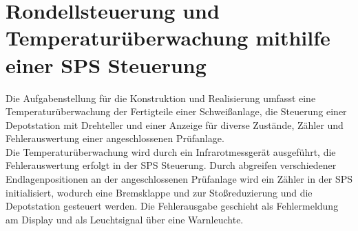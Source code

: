 \documentclass[12pt,a4paper]{scrartcl}	%
\begin{document}
\section{Rondellsteuerung und Temperaturüberwachung mithilfe einer SPS Steuerung}
Die Aufgabenstellung für die Konstruktion und Realisierung umfasst eine Temperaturüberwachung der Fertigteile einer Schweißanlage, die Steuerung einer Depotstation mit Drehteller und einer Anzeige für diverse Zustände, Zähler und Fehlerauswertung einer angeschlossenen Prüfanlage.\\
Die Temperaturüberwachung wird durch ein Infrarotmessgerät ausgeführt, die Fehlerauswertung erfolgt in der SPS Steuerung. Durch abgreifen verschiedener Endlagenpositionen an der angeschlossenen Prüfanlage wird ein Zähler in der SPS initialisiert, wodurch  eine Bremsklappe und zur Stoßreduzierung und die Depotstation gesteuert werden. Die Fehlerausgabe geschieht als Fehlermeldung am Display und als Leuchtsignal über eine Warnleuchte.
\end{document}
